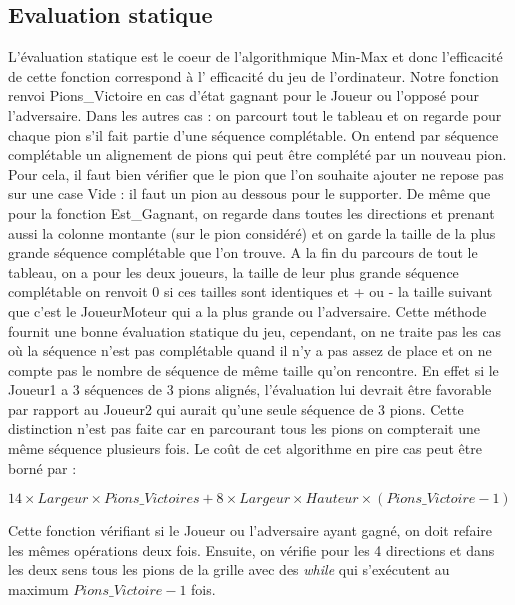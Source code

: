 \documentclass[a4paper, 10pt, french]{article}
\begin{document}
{    \subsection{Evaluation statique}
    {
        L'évaluation statique est le coeur de l'algorithmique Min-Max et donc l'efficacité de cette fonction correspond à l'
        efficacité du jeu de l'ordinateur. Notre fonction renvoi Pions\_Victoire en cas d'état gagnant pour le Joueur ou
        l'opposé pour l'adversaire.
        Dans les autres cas : on parcourt tout le tableau et on regarde pour chaque pion s'il fait partie d'une séquence
        complétable. On entend par séquence complétable un alignement de pions qui peut être complété par un nouveau pion.
        Pour cela, il faut bien vérifier que le pion que l'on souhaite ajouter ne repose pas sur une case Vide : il faut un pion au
        dessous pour le supporter.
        De même que pour la fonction Est\_Gagnant, on regarde dans toutes les directions et prenant aussi la colonne montante (sur
        le pion considéré) et on garde la taille de la plus grande séquence complétable que l'on trouve.
        A la fin du parcours de tout le tableau, on a pour les deux joueurs, la taille de leur plus grande séquence complétable
        on renvoit 0 si ces tailles sont identiques et + ou - la taille suivant que c'est le JoueurMoteur qui a la plus grande
        ou l'adversaire.
        Cette méthode fournit une bonne évaluation statique du jeu, cependant, on ne traite pas les cas où la séquence n'est pas
        complétable quand il n'y a pas assez de place et on ne compte pas le nombre de séquence de même taille qu'on rencontre.
        En effet si le Joueur1 a 3 séquences de 3 pions alignés, l'évaluation lui devrait être favorable par rapport au Joueur2
        qui aurait qu'une seule séquence de 3 pions. Cette distinction n'est pas faite car en parcourant tous les pions on
        compterait une même séquence plusieurs fois.
        Le coût de cet algorithme en pire cas peut être borné par :
        \begin{center}
            $14 \times Largeur \times Pions\_Victoires + 8 \times Largeur \times Hauteur \times (Pions\_Victoire - 1)$
        \end{center}
        Cette fonction vérifiant si le Joueur ou l'adversaire ayant gagné, on doit refaire les mêmes opérations deux fois.
        Ensuite, on vérifie pour les 4 directions et dans les deux sens tous les pions de la grille avec des {\em while} qui
        s'exécutent au maximum $Pions\_Victoire - 1$ fois.
    }

}
\end{document}
